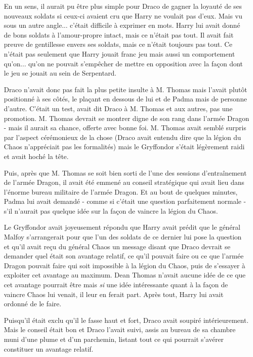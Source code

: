 En un sens, il aurait pu être plus simple pour Draco de gagner la loyauté de ses nouveaux soldats si ceux-ci avaient cru que Harry ne voulait pas d'eux. Mais vu sous un autre angle... c'était difficile à exprimer en mots. Harry lui avait donné de bons soldats à l'amour-propre intact, mais ce n'était pas tout. Il avait fait preuve de gentillesse envers ses soldats, mais ce n'était toujours pas tout. Ce n'était pas seulement que Harry jouait franc jeu mais aussi un comportement qu'on... qu'on ne pouvait s'empêcher de mettre en opposition avec la façon dont le jeu se jouait au sein de Serpentard.

Draco n'avait donc pas fait la plus petite insulte à M. Thomas mais l'avait plutôt positionné à ses côtés, le plaçant en dessous de lui et de Padma mais de personne d'autre. C'était un test, avait dit Draco à M. Thomas et aux autres, pas une promotion. M. Thomas devrait se montrer digne de son rang dans l'armée Dragon - mais il aurait sa chance, offerte avec bonne foi. M. Thomas avait semblé surpris par l'aspect cérémonieux de la chose (Draco avait entendu dire que la légion du Chaos n'appréciait pas les formalités) mais le Gryffondor s'était légèrement raidi et avait hoché la tête.

Puis, après que M. Thomas se soit bien sorti de l'une des sessions d'entraînement de l'armée Dragon, il avait été emmené au conseil stratégique qui avait lieu dans l'énorme bureau militaire de l'armée Dragon. Et au bout de quelques minutes, Padma lui avait demandé - comme si c'était une question parfaitement normale - s'il n'aurait pas quelque idée sur la façon de vaincre la légion du Chaos.

Le Gryffondor avait joyeusement répondu que Harry avait prédit que le général Malfoy s'arrangerait pour que l'un des soldats de ce dernier lui pose la question et qu'il avait reçu du général Chaos un message disant que Draco devrait se demander quel était son avantage relatif, ce qu'il pouvait faire ou ce que l'armée Dragon pouvait faire qui soit impossible à la légion du Chaos, puis de s'essayer à exploiter cet avantage au maximum. Dean Thomas n'avait aucune idée de ce que cet avantage pourrait être mais \emph{si}  une idée intéressante quant à la façon de vaincre Chaos lui venait, il leur en ferait part. Après tout, Harry lui avait ordonné de le faire.

Puisqu'il était exclu qu'il le fasse haut et fort, Draco avait soupiré intérieurement. Mais le conseil était bon et Draco l'avait suivi, assis au bureau de sa chambre muni d'une plume et d'un parchemin, listant tout ce qui pourrait s'avérer constituer un avantage relatif.

